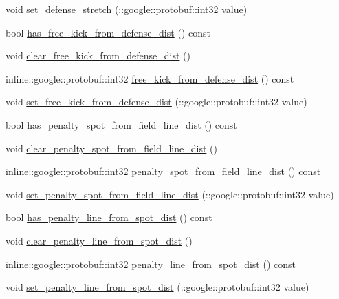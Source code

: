 \begin{DoxyCompactItemize}
void \hyperlink{class_s_s_l___geometry_field_size_a3d6d3abd47cb5a4fc8465f11aa87d354}{set\-\_\-defense\-\_\-stretch} (\-::google\-::protobuf\-::int32 value)
\item 
bool \hyperlink{class_s_s_l___geometry_field_size_a39df2c4270b5dfaee6b14d9f1a0c9ce0}{has\-\_\-free\-\_\-kick\-\_\-from\-\_\-defense\-\_\-dist} () const 
\item 
void \hyperlink{class_s_s_l___geometry_field_size_a687375a48e18e3b1257993788e55128d}{clear\-\_\-free\-\_\-kick\-\_\-from\-\_\-defense\-\_\-dist} ()
\item 
inline\-::google\-::protobuf\-::int32 \hyperlink{class_s_s_l___geometry_field_size_a3ad0dee21a36a9466eada376a852660a}{free\-\_\-kick\-\_\-from\-\_\-defense\-\_\-dist} () const 
\item 
void \hyperlink{class_s_s_l___geometry_field_size_ab62fa4dc0da96216672dc51c57002778}{set\-\_\-free\-\_\-kick\-\_\-from\-\_\-defense\-\_\-dist} (\-::google\-::protobuf\-::int32 value)
\item 
bool \hyperlink{class_s_s_l___geometry_field_size_a1bdbf009304354ac82cd052cade63461}{has\-\_\-penalty\-\_\-spot\-\_\-from\-\_\-field\-\_\-line\-\_\-dist} () const 
\item 
void \hyperlink{class_s_s_l___geometry_field_size_a067df75ad3c00b5f237a5cf2dbee4219}{clear\-\_\-penalty\-\_\-spot\-\_\-from\-\_\-field\-\_\-line\-\_\-dist} ()
\item 
inline\-::google\-::protobuf\-::int32 \hyperlink{class_s_s_l___geometry_field_size_a9a9eac8531a83918b3d7758c2da91155}{penalty\-\_\-spot\-\_\-from\-\_\-field\-\_\-line\-\_\-dist} () const 
\item 
void \hyperlink{class_s_s_l___geometry_field_size_af21bab1566ed7cf44efa169123f19dd8}{set\-\_\-penalty\-\_\-spot\-\_\-from\-\_\-field\-\_\-line\-\_\-dist} (\-::google\-::protobuf\-::int32 value)
\item 
bool \hyperlink{class_s_s_l___geometry_field_size_a72f8a6a7bc1aec96fe731d1191529489}{has\-\_\-penalty\-\_\-line\-\_\-from\-\_\-spot\-\_\-dist} () const 
\item 
void \hyperlink{class_s_s_l___geometry_field_size_a2a8664ecc2aeabe31331cf506ab1e5e8}{clear\-\_\-penalty\-\_\-line\-\_\-from\-\_\-spot\-\_\-dist} ()
\item 
inline\-::google\-::protobuf\-::int32 \hyperlink{class_s_s_l___geometry_field_size_a3ea81c1be638b3673398789607d7b7c9}{penalty\-\_\-line\-\_\-from\-\_\-spot\-\_\-dist} () const 
\item 
void \hyperlink{class_s_s_l___geometry_field_size_a081bf8ba21b9a0ababc440ea84bbbf25}{set\-\_\-penalty\-\_\-line\-\_\-from\-\_\-spot\-\_\-dist} (\-::google\-::protobuf\-::int32 value)
\end{DoxyCompactItemize}
